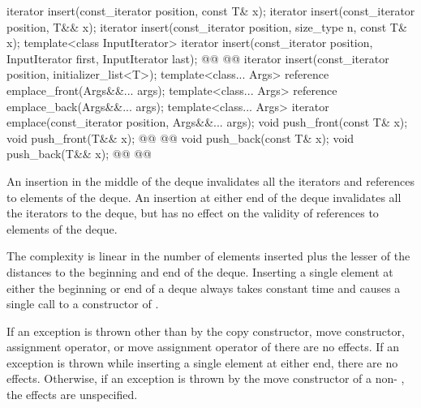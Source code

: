 \documentclass{wg21}
\begin{document}
%
%
%
%
\begin{itemdecl}
    iterator insert(const_iterator position, const T& x);
    iterator insert(const_iterator position, T&& x);
    iterator insert(const_iterator position, size_type n, const T& x);
    template<class InputIterator>
    iterator insert(const_iterator position, InputIterator first, InputIterator last);
    @@
    @@
    iterator insert(const_iterator position, initializer_list<T>);
    template<class... Args> reference emplace_front(Args&&... args);
    template<class... Args> reference emplace_back(Args&&... args);
    template<class... Args> iterator emplace(const_iterator position, Args&&... args);
    void push_front(const T& x);
    void push_front(T&& x);
    @@
    @@
    void push_back(const T& x);
    void push_back(T&& x);
    @@
    @@
\end{itemdecl}

\begin{itemdescr}
    \pnum
    \effects
    An insertion in the middle of the deque invalidates all the iterators and
    references to elements of the deque.
    An insertion at either end of the
    deque invalidates all the iterators to the deque, but has no effect on
    the validity of references to elements of the deque.

    \pnum
    \complexity
    The complexity is linear in the number of elements inserted plus the lesser
    of the distances to the beginning and end of the deque.
    Inserting a single element at either the beginning or end of a deque always takes constant time
    and causes a single call to a constructor of
    .

    \pnum
    \remarks
    If an exception is thrown other than by the
    copy constructor, move constructor,
    assignment operator, or move assignment operator of
    there are no effects.
    If an exception is thrown while inserting a single element at either end,
    there are no effects.
    Otherwise, if an exception is thrown by the move constructor of a
    non-
    , the effects are unspecified.
\end{itemdescr}
\end{document}
